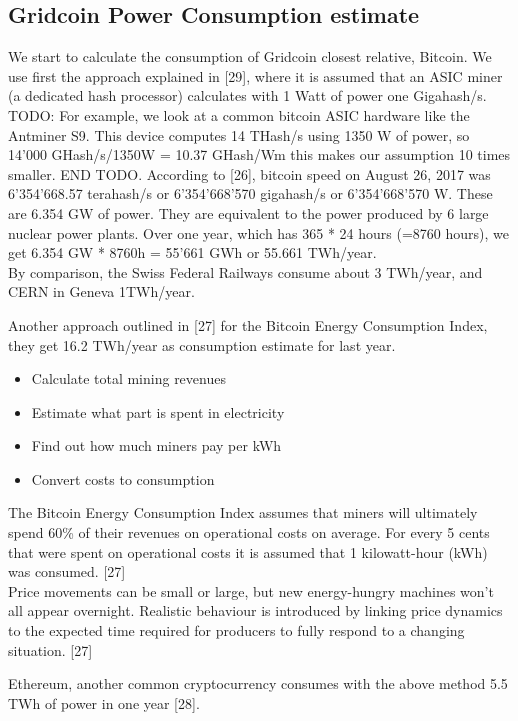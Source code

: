 \subsection{Gridcoin Power Consumption estimate}

We start to calculate the consumption of Gridcoin closest relative, Bitcoin. 
We use first the approach explained in [29], where it is assumed that an ASIC miner (a dedicated hash processor) calculates with 1 Watt of power one Gigahash/s. TODO: For example, we look at a common bitcoin ASIC hardware like the Antminer S9. This device computes 14 THash/s using 1350 W of power, so 14'000 GHash/s/1350W = 10.37 GHash/Wm this makes our assumption 10 times smaller. END TODO. According to [26], bitcoin speed on August 26, 2017 was 6'354'668.57 terahash/s or 6'354'668'570 gigahash/s or 6'354'668'570 W. These are 6.354 GW of power. They are equivalent to the power produced by 6 large nuclear power plants. Over one year, which has 365 * 24 hours (=8760 hours), we get 6.354 GW * 8760h = 55'661 GWh or 55.661 TWh/year.\\ 

By comparison, the Swiss Federal Railways consume about 3 TWh/year, and CERN in Geneva 1TWh/year.

Another approach outlined in [27] for the Bitcoin Energy Consumption Index, they get 16.2 TWh/year as consumption estimate for last year.

\begin{itemize}
	\item Calculate total mining revenues
	\item Estimate what part is spent in electricity
	\item Find out how much miners pay per kWh
	\item Convert costs to consumption
\end{itemize}

The Bitcoin Energy Consumption Index assumes that miners will ultimately spend 60\% of their revenues on operational costs on average. For every 5 cents that were spent on operational costs it is assumed that 1 kilowatt-hour (kWh) was consumed. [27]\\

Price movements can be small or large, but new energy-hungry machines won't all appear overnight. Realistic behaviour is introduced by linking price dynamics to the expected time required for producers to fully respond to a changing situation. [27]

Ethereum, another common cryptocurrency consumes with the above method 5.5 TWh of power in one year [28].\\

